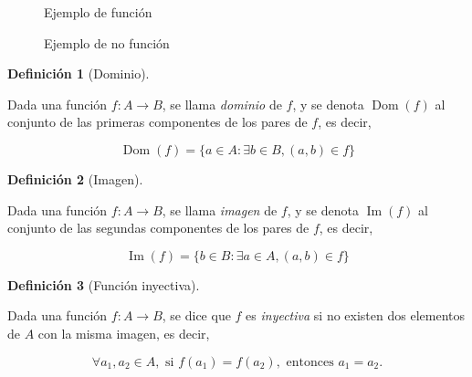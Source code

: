 \documentclass[
  a4paper,
]{scrreport}
\theoremstyle{definition}
\newtheorem{definition}{Definición}[chapter]
\theoremstyle{plain}
\theoremstyle{plain}
\theoremstyle{definition}
\theoremstyle{definition}
\theoremstyle{plain}
\theoremstyle{remark}
\begin{document}
\begin{figure}

\begin{minipage}[t]{0.50\linewidth}

{\centering 

\raisebox{-\height}{



}

\caption{Ejemplo de función}

}

\end{minipage}%
%
\begin{minipage}[t]{0.50\linewidth}

{\centering 

\raisebox{-\height}{



}

\caption{Ejemplo de no función}

}

\end{minipage}%

\end{figure}

\begin{definition}[Dominio]\protect\hypertarget{def-dominio-funcion}{}\label{def-dominio-funcion}

Dada una función \(f:A\rightarrow B\), se llama \emph{dominio} de \(f\),
y se denota \(\operatorname{Dom}(f)\) al conjunto de las primeras
componentes de los pares de \(f\), es decir,

\[\operatorname{Dom}(f) = \{a\in A: \exists b\in B, (a,b)\in f\}\]

\end{definition}

\begin{definition}[Imagen]\protect\hypertarget{def-imagen-funcion}{}\label{def-imagen-funcion}

Dada una función \(f:A\rightarrow B\), se llama \emph{imagen} de \(f\),
y se denota \(\operatorname{Im}(f)\) al conjunto de las segundas
componentes de los pares de \(f\), es decir,

\[\operatorname{Im}(f) = \{b\in B: \exists a\in A, (a,b)\in f\}\]

\end{definition}

\begin{definition}[Función
inyectiva]\protect\hypertarget{def-funcion-inyectiva}{}\label{def-funcion-inyectiva}

Dada una función \(f:A\rightarrow B\), se dice que \(f\) es
\emph{inyectiva} si no existen dos elementos de \(A\) con la misma
imagen, es decir,

\[\forall a_1, a_2 \in A, \mbox{ si } f(a_1) = f(a_2), \mbox{ entonces } a_1 = a_2.\]

\end{definition}
\end{document}
